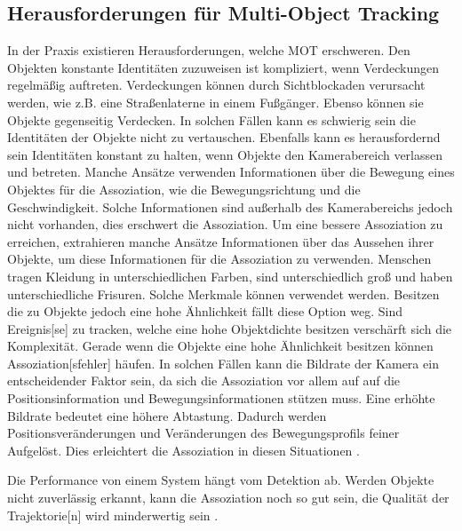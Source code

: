 \subsection{Herausforderungen für Multi-Object Tracking} \label{sec:MOT Herausforderungen}
In der Praxis existieren Herausforderungen, welche \gls{MOT} erschweren. Den Objekten konstante Identitäten zuzuweisen ist kompliziert, wenn Verdeckungen regelmäßig auftreten. Verdeckungen können durch Sichtblockaden verursacht werden, wie z.B. eine Straßenlaterne in einem Fußgänger. Ebenso können sie Objekte gegenseitig Verdecken. In solchen Fällen kann es schwierig sein die Identitäten der Objekte nicht zu vertauschen. Ebenfalls kann es herausfordernd sein Identitäten konstant zu halten, wenn Objekte den Kamerabereich verlassen und betreten. Manche Ansätze verwenden Informationen über die Bewegung eines Objektes für die  \gls{Assoziation}, wie die Bewegungsrichtung und die Geschwindigkeit. Solche Informationen sind außerhalb des Kamerabereichs jedoch nicht vorhanden, dies erschwert die \gls{Assoziation}. Um eine bessere \gls{Assoziation} zu erreichen, extrahieren manche Ansätze Informationen über das Aussehen ihrer Objekte, um diese Informationen für die \gls{Assoziation} zu verwenden. Menschen tragen Kleidung in unterschiedlichen Farben, sind unterschiedlich groß und haben unterschiedliche Frisuren. Solche Merkmale können verwendet werden. Besitzen die zu  Objekte jedoch eine hohe Ähnlichkeit fällt diese Option weg. Sind \gls{Ereignis}[se] zu tracken, welche eine hohe Objektdichte besitzen verschärft sich die Komplexität. Gerade wenn die Objekte eine hohe Ähnlichkeit besitzen können \gls{Assoziation}[sfehler] häufen. 
In solchen Fällen kann die Bildrate der Kamera ein entscheidender Faktor sein, da sich die \gls{Assoziation} vor allem auf auf die Positionsinformation und Bewegungsinformationen stützen muss. Eine erhöhte Bildrate bedeutet eine höhere Abtastung. Dadurch werden Positionsveränderungen und Veränderungen des Bewegungsprofils feiner Aufgelöst. Dies erleichtert die \gls{Assoziation} in diesen Situationen \cite{Luo.2022, Feng.2022}. \par

Die Performance von einem  System hängt vom \gls{Detektion} ab. Werden Objekte nicht zuverlässig erkannt, kann die \gls{Assoziation} noch so gut sein, die Qualität der \gls{Trajektorie}[n] wird minderwertig sein \cite{Luo.2022}. 


